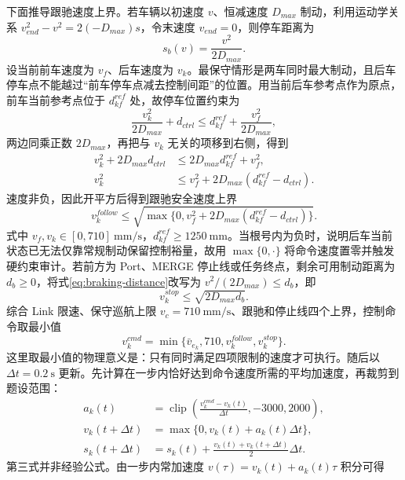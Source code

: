 \documentclass[UTF8]{ctexart}
\begin{document}
下面推导跟驰速度上界。若车辆以初速度 $v$、恒减速度 $D_{max}$ 制动，利用运动学关系 $v_{end}^2-v^2=2(-D_{max})s$，令末速度 $v_{end}=0$，则停车距离为
\begin{equation}\label{eq:braking-distance}
s_b(v)=\frac{v^2}{2D_{max}}.
\end{equation}
设当前前车速度为 $v_f$、后车速度为 $v_k$。最保守情形是两车同时最大制动，且后车停车点不能越过“前车停车点减去控制间距”的位置。用当前后车参考点作为原点，前车当前参考点位于 $d_{kf}^{ref}$ 处，故停车位置约束为
\begin{equation}
\frac{v_k^2}{2D_{max}}+d_{ctrl}\le d_{kf}^{ref}+\frac{v_f^2}{2D_{max}},
\end{equation}
两边同乘正数 $2D_{max}$，再把与 $v_k$ 无关的项移到右侧，得到
\begin{align}
v_k^2+2D_{max}d_{ctrl}&\le2D_{max}d_{kf}^{ref}+v_f^2,\\
v_k^2&\le v_f^2+2D_{max}(d_{kf}^{ref}-d_{ctrl}).
\end{align}
速度非负，因此开平方后得到跟驰安全速度上界
\begin{equation}\label{eq:safe-speed}
v_k^{follow}\le\sqrt{\max\{0,v_f^2+2D_{max}(d_{kf}^{ref}-d_{ctrl})\}}.
\end{equation}
式中 $v_f,v_k\in[0,710]\ \mathrm{mm/s}$，$d_{kf}^{ref}\ge1250\ \mathrm{mm}$。当根号内为负时，说明后车当前状态已无法仅靠常规制动保留控制裕量，故用 $\max\{0,\cdot\}$ 将命令速度置零并触发硬约束审计。若前方为 Port、MERGE 停止线或任务终点，剩余可用制动距离为 $d_b\ge0$，将式\eqref{eq:braking-distance}改写为 $v^2/(2D_{max})\le d_b$，即
\begin{equation}\label{eq:stop-speed}
v_k^{stop}\le\sqrt{2D_{max}d_b}.
\end{equation}
综合 Link 限速、保守巡航上限 $v_c=710\ \mathrm{mm/s}$、跟驰和停止线四个上界，控制命令取最小值
\begin{equation}
v_k^{cmd}=\min\{\bar v_{e_k},710,v_k^{follow},v_k^{stop}\}.
\end{equation}
这里取最小值的物理意义是：只有同时满足四项限制的速度才可执行。随后以 $\Delta t=0.2\ \mathrm{s}$ 更新。先计算在一步内恰好达到命令速度所需的平均加速度，再裁剪到题设范围：
\begin{align}
a_k(t)&=\operatorname{clip}\left(\frac{v_k^{cmd}-v_k(t)}{\Delta t},-3000,2000\right),\\
v_k(t+\Delta t)&=\max\{0,v_k(t)+a_k(t)\Delta t\},\\
s_k(t+\Delta t)&=s_k(t)+\frac{v_k(t)+v_k(t+\Delta t)}2\Delta t.
\end{align}
第三式并非经验公式。由一步内常加速度 $v(\tau)=v_k(t)+a_k(t)\tau$ 积分可得
\end{document}
